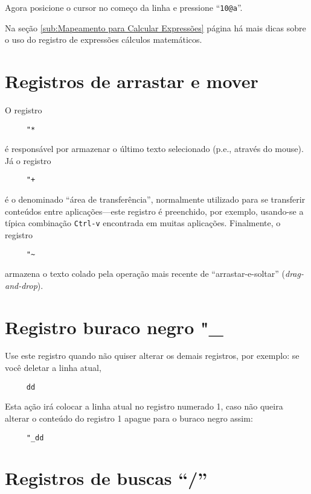 Agora posicione o cursor no começo da linha e pressione ``\verb|10@a|''.


{\Large {}} Na seção \ref{sub:Mapeamento para Calcular Expressões} página
\pageref{sub:Mapeamento para Calcular Expressões} há mais dicas sobre o uso do
registro de expressões cálculos matemáticos.

\section{Registros de arrastar e mover}
\label{Registros de arrastar e mover}

O registro 
\begin{verbatim}
     "*
\end{verbatim}
 é responsável por armazenar o último texto selecionado (p.e., através do
mouse). Já o registro 
\begin{verbatim}
     "+
\end{verbatim}
é o denominado ``área de transferência'', normalmente utilizado para se
transferir conteúdos entre aplicações---este registro é preenchido, por
exemplo, usando-se a típica combinação {\tt Ctrl-v} encontrada em muitas
aplicações. Finalmente, o registro 
\begin{verbatim}
     "~
\end{verbatim}
armazena o texto colado pela operação mais recente de ``arrastar-e-soltar''
({\em drag-and-drop}). 

\section{Registro buraco negro "\_}
\label{Registro buraco negro}

Use este registro quando não quiser alterar os demais registros, por exemplo:
se você deletar a linha atual,

\begin{verbatim}
     dd
\end{verbatim}

Esta ação irá colocar a linha atual no registro numerado 1, caso não
queira alterar o conteúdo do registro 1 apague para o buraco negro
assim:

\begin{verbatim}
     "_dd
\end{verbatim}

\section{Registros de buscas ``/''}
\label{Registros de buscas ``/''}

